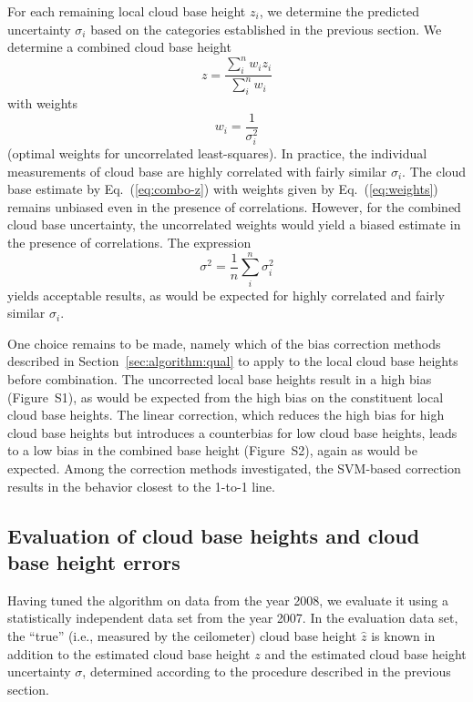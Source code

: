 \documentclass[amt,manuscript]{copernicus}\usepackage[]{graphicx}\usepackage[]{color}
\begin{document}
For each remaining local cloud base height $z_i$, we determine the predicted
uncertainty $\sigma_i$ based on the categories established in the previous
section.  We determine a combined cloud base height
\begin{equation}
  \label{eq:combo-z}
  z = \frac{\sum\limits_i^n w_i z_i}{\sum\limits_i^n w_i}
\end{equation}
with weights
\begin{equation}
  \label{eq:weights}
  w_i = \frac 1 {\sigma_i^2}
\end{equation}
(optimal weights for uncorrelated least-squares).  In practice, the individual
measurements of cloud base are highly correlated with fairly similar
$\sigma_i$.  The cloud base estimate by Eq.~(\ref{eq:combo-z}) with weights
given by Eq.~(\ref{eq:weights}) remains unbiased even in the presence of
correlations.  However, for the combined cloud base uncertainty,
the uncorrelated weights would yield a biased estimate in the presence of
correlations.  The expression
\begin{equation}
  \label{eq:combo-sigma}
  \sigma^2 = \frac 1 n \sum\limits_i^n \sigma_i^2
\end{equation}
yields acceptable results, as would be expected for highly correlated and fairly
similar $\sigma_i$.

One choice remains to be made, namely which of the bias correction methods
described in Section~\ref{sec:algorithm:qual} to apply to the local cloud base
heights before combination.  The uncorrected local base heights result in a high
bias (Figure~S1), as would be expected from the high bias on the constituent
local cloud base heights.  The linear correction, which reduces the high bias
for high cloud base heights but introduces a counterbias for low cloud base
heights, leads to a low bias in the combined base height (Figure~S2), again as
would be expected.  Among the correction methods investigated, the SVM-based
correction results in the behavior closest to the 1-to-1 line.

\subsection{Evaluation of cloud base heights and cloud base height errors}
\label{sec:algorithm:eval}




Having tuned the algorithm on data from the year 2008, we evaluate it using a
statistically independent data set from the year 2007.  In the evaluation data
set, the ``true'' (i.e., measured by the ceilometer) cloud base height $\hat{z}$
is known in addition to the estimated cloud base height $z$ and the estimated
cloud base height uncertainty $\sigma$, determined according to the procedure
described in the previous section.
\end{document}
